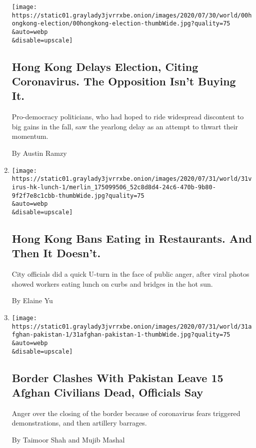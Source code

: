 \begin{enumerate}
  \texttt{[image: https://static01.graylady3jvrrxbe.onion/images/2020/07/30/world/00hongkong-election/00hongkong-election-thumbWide.jpg?quality=75\\\&auto=webp\\\&disable=upscale]}

  \hypertarget{hong-kong-delays-election-citing-coronavirus-the-opposition-isnt-buying-it}{%
  \subsection{Hong Kong Delays Election, Citing Coronavirus. The
  Opposition Isn't Buying
  It.}\label{hong-kong-delays-election-citing-coronavirus-the-opposition-isnt-buying-it}}

  Pro-democracy politicians, who had hoped to ride widespread discontent
  to big gains in the fall, saw the yearlong delay as an attempt to
  thwart their momentum.

  By Austin Ramzy
\item
  \href{/2020/07/31/world/asia/hongkong-dining-lunch-coronavirus.html}{}

  \texttt{[image: https://static01.graylady3jvrrxbe.onion/images/2020/07/31/world/31virus-hk-lunch-1/merlin\_175099506\_52c8d8d4-24c6-470b-9b80-9f2f7e8c1cbb-thumbWide.jpg?quality=75\\\&auto=webp\\\&disable=upscale]}

  \hypertarget{hong-kong-bans-eating-in-restaurants-and-then-it-doesnt}{%
  \subsection{Hong Kong Bans Eating in Restaurants. And Then It
  Doesn't.}\label{hong-kong-bans-eating-in-restaurants-and-then-it-doesnt}}

  City officials did a quick U-turn in the face of public anger, after
  viral photos showed workers eating lunch on curbs and bridges in the
  hot sun.

  By Elaine Yu
\item
  \href{/2020/07/31/world/asia/afghanistan-pakistan-border.html}{}

  \texttt{[image: https://static01.graylady3jvrrxbe.onion/images/2020/07/31/world/31afghan-pakistan-1/31afghan-pakistan-1-thumbWide.jpg?quality=75\\\&auto=webp\\\&disable=upscale]}

  \hypertarget{border-clashes-with-pakistan-leave-15-afghan-civilians-dead-officials-say}{%
  \subsection{Border Clashes With Pakistan Leave 15 Afghan Civilians
  Dead, Officials
  Say}\label{border-clashes-with-pakistan-leave-15-afghan-civilians-dead-officials-say}}

  Anger over the closing of the border because of coronavirus fears
  triggered demonstrations, and then artillery barrages.

  By Taimoor Shah and Mujib Mashal
\end{enumerate}

